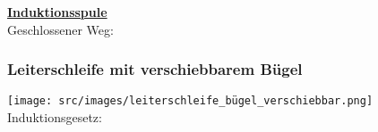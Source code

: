     \centering \underline{\textbf{Induktionsspule}}\\
    Geschlossener Weg: 

    \subsubsection{Leiterschleife mit verschiebbarem Bügel}
        \texttt{[image: src/images/leiterschleife\_bügel\_verschiebbar.png]}
        Induktionsgesetz:
